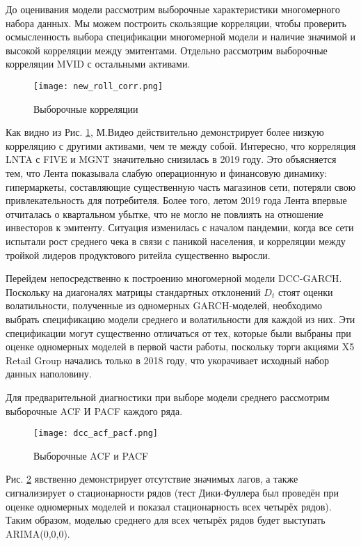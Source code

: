 \documentclass[a4paper,11pt]{article}
\begin{document}
До оценивания модели рассмотрим выборочные характеристики многомерного набора данных. Мы можем построить скользящие корреляции, чтобы проверить осмысленность выбора спецификации многомерной модели и наличие значимой и высокой корреляции между эмитентами. Отдельно рассмотрим выборочные корреляции MVID с остальными активами.

\begin{figure}[h]
  \advance\leftskip-1.4cm
    \texttt{[image: new\_roll\_corr.png]}
    \caption{Выборочные корреляции}
    \label{fig:rollcorr1}
\end{figure}

Как видно из Рис. \ref{fig:rollcorr1}, М.Видео действительно демонстрирует более низкую корреляцию с другими активами, чем те между собой. Интересно, что корреляция LNTA с FIVE и MGNT значительно снизилась в 2019 году. Это объясняется тем, что Лента показывала слабую операционную и финансовую динамику: гипермаркеты, составляющие существенную часть магазинов сети, потеряли свою привлекательность для потребителя. Более того, летом 2019 года Лента впервые отчиталась о квартальном убытке, что не могло не повлиять на отношение инвесторов к эмитенту. Ситуация изменилась с началом пандемии, когда все сети испытали рост среднего чека в связи с паникой населения, и корреляции между тройкой лидеров продуктового ритейла существенно выросли.  

Перейдем непосредственно к построению многомерной модели DCC-GARCH. Поскольку на диагоналях матрицы стандартных отклонений $D_t$ стоят оценки волатильности, полученные из одномерных GARCH-моделей, необходимо выбрать спецификацию модели среднего и волатильности для каждой из них. Эти спецификации могут существенно отличаться от тех, которые были выбраны при оценке одномерных моделей в первой части работы, поскольку торги акциями X5 Retail Group начались только в 2018 году, что укорачивает исходный набор данных наполовину.

Для предварительной диагностики при выборе модели среднего рассмотрим выборочные ACF И PACF каждого ряда.

\begin{figure}[h]
  \advance\leftskip-1.5cm
    \texttt{[image: dcc\_acf\_pacf.png]}
    \caption{Выборочные ACF и PACF}
    \label{fig:acfpacf}
\end{figure}

Рис. \ref{fig:acfpacf} явственно демонстрирует отсутствие значимых лагов, а также сигнализирует о стационарности рядов (тест Дики-Фуллера был проведён при оценке одномерных моделей и показал стационарность всех четырёх рядов). Таким образом, моделью среднего для всех четырёх рядов будет выступать ARIMA(0,0,0). 
\end{document}
